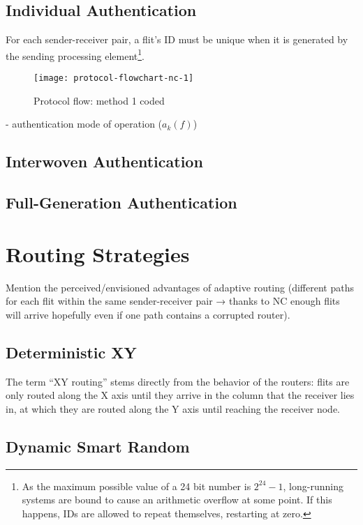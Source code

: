 \subsection{Individual Authentication}
For each sender-receiver pair, a
flit's ID must be unique when it is generated by the sending processing element\footnote{As the maximum possible value of a 24 bit number is
$2^{24}-1$, long-running systems are bound to cause an arithmetic overflow at some point. If this happens, IDs are allowed to repeat themselves,
restarting at zero.}. 
\begin{figure}
    \centering
    \texttt{[image: protocol-flowchart-nc-1]}
    \caption[Protocol flow: method 1 coded]{Protocol flow: method 1 coded}
    \label{fig:protchartnc1}
\end{figure}

- authentication mode of operation ($a_k(f)$)

\subsection{Interwoven Authentication}

\subsection{Full-Generation Authentication}

\section{Routing Strategies}
Mention the perceived/envisioned advantages of adaptive routing (different paths for each flit within the same sender-receiver pair → thanks
to NC enough flits will arrive hopefully even if one path contains a corrupted router).

\subsection{Deterministic XY}
The term \enquote{XY routing} stems directly from the behavior of the routers: flits are only routed along the X axis until they arrive in the column
that the receiver lies in, at which they are routed along the Y axis until reaching the receiver node.
\subsection{Dynamic Smart Random}

